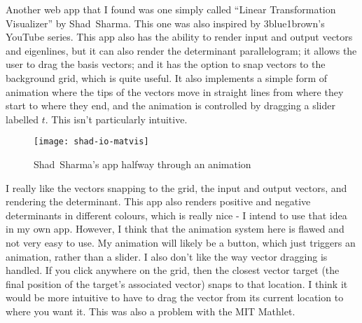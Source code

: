 \documentclass[../main.tex]{subfiles}
\begin{document}
Another web app that I found was one simply called \enquote{Linear Transformation Visualizer} by Shad~Sharma\cite{shad-io-matvis}. This one was also inspired by 3blue1brown's YouTube series. This app also has the ability to render input and output vectors and eigenlines, but it can also render the determinant parallelogram; it allows the user to drag the basis vectors; and it has the option to snap vectors to the background grid, which is quite useful. It also implements a simple form of animation where the tips of the vectors move in straight lines from where they start to where they end, and the animation is controlled by dragging a slider labelled $t$. This isn't particularly intuitive.

\begin{figure}[h]
	\centering
	\texttt{[image: shad-io-matvis]}
	\caption{Shad~Sharma's app halfway through an animation}
	\label{fig:shad-io-matvis}
\end{figure}

I really like the vectors snapping to the grid, the input and output vectors, and rendering the determinant. This app also renders positive and negative determinants in different colours, which is really nice - I intend to use that idea in my own app. However, I think that the animation system here is flawed and not very easy to use. My animation will likely be a button, which just triggers an animation, rather than a slider. I also don't like the way vector dragging is handled. If you click anywhere on the grid, then the closest vector target (the final position of the target's associated vector) snaps to that location. I think it would be more intuitive to have to drag the vector from its current location to where you want it. This was also a problem with the MIT Mathlet.
\end{document}
